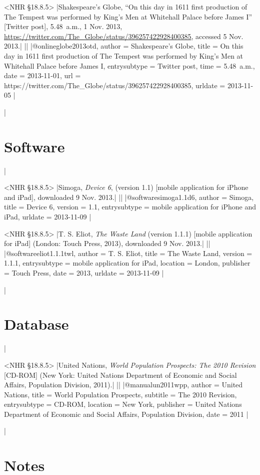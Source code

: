 \documentclass[extrafontsizes,11pt,a4paper,oneside]{memoir}
\begin{document}
\bibexample<NHR \S18.8.5>
|Shakespeare's Globe, \enquote{On this day in 1611 first production of The Tempest was performed by King's Men at Whitehall Palace before James I} [Twitter post], 5.48~a.m., 1 Nov. 2013, \url{https://twitter.com/The_Globe/status/396257422928400385}, accessed 5 Nov. 2013.|%
||%
|@online{globe2013otd,
  author = {{Shakespeare's Globe}},
  title = {On this day in 1611 first production of The Tempest was performed by King's Men at Whitehall Palace before James I},
  entrysubtype = {Twitter post},
  time = {5.48~a.m.},
  date = {2013-11-01},
  url = {https://twitter.com/The_Globe/status/396257422928400385},
  urldate = {2013-11-05}
}|

\todoc|
\section{Software}
|

\bibexample<NHR \S18.8.5>
|Simoga, \emph{Device 6}, (version 1.1) [mobile application for iPhone and iPad], downloaded 9 Nov. 2013.|%
||%
|@software{simoga1.1d6,
  author = {Simoga},
  title = {Device 6},
  version = {1.1},
  entrysubtype = {mobile application for iPhone and iPad},
  urldate = {2013-11-09}
}|

\bibexample<NHR \S18.8.5>
|T. S. Eliot, \emph{The Waste Land} (version 1.1.1) [mobile application for iPad] (London: Touch Press, 2013), downloaded 9 Nov. 2013.|%
||%
|@software{eliot1.1.1twl,
  author = {T. S. Eliot},
  title = {The Waste Land},
  version = {1.1.1},
  entrysubtype = {mobile application for iPad},
  location = {London},
  publisher = {Touch Press},
  date = {2013},
  urldate = {2013-11-09}
}|

\todoc|
\section{Database}
|

\bibexample<NHR \S18.8.5>
|United Nations, \emph{World Population Prospects: The 2010 Revision} [CD-ROM] (New York: United Nations Department of Economic and Social Affairs, Population Division, 2011).|%
||%
|@manual{un2011wpp,
  author = {{United Nations}},
  title = {World Population Prospects},
  subtitle = {The 2010 Revision},
  entrysubtype = {CD-ROM},
  location = {New York},
  publisher = {United Nations Department of Economic and Social Affairs, Population Division},
  date = {2011}
}|

\todoc|
\section{Notes}
\end{document}
